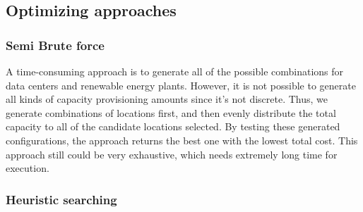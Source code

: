 \subsection{Optimizing approaches}
\subsubsection{Semi Brute force}
A time-consuming approach is to generate all of the possible combinations for data centers and renewable energy plants. However, it is not possible to generate all kinds of capacity provisioning amounts since it's not discrete. Thus, we generate combinations of locations first, and then evenly distribute the total capacity to all of the candidate locations selected. By testing these generated configurations, the approach returns the best one with the lowest total cost. This approach still could be very exhaustive, which needs extremely long time for execution.

\subsubsection{Heuristic searching}



